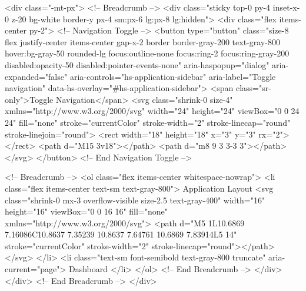 

















<div class="-mt-px">
    <!-- Breadcrumb -->
    <div class="sticky top-0 py-4 inset-x-0 z-20 bg-white border-y px-4 sm:px-6 lg:px-8 lg:hidden">
        <div class="flex items-center py-2">
            <!-- Navigation Toggle -->
            <button type="button"
                class="size-8 flex justify-center items-center gap-x-2 border border-gray-200 text-gray-800 hover:bg-gray-50 rounded-lg focus:outline-none focus:ring-2 focus:ring-gray-200 disabled:opacity-50 disabled:pointer-events-none"
                aria-haspopup="dialog" aria-expanded="false" aria-controls="hs-application-sidebar"
                aria-label="Toggle navigation" data-hs-overlay="#hs-application-sidebar">
                <span class="sr-only">Toggle Navigation</span>
                <svg class="shrink-0 size-4" xmlns="http://www.w3.org/2000/svg" width="24" height="24"
                    viewBox="0 0 24 24" fill="none" stroke="currentColor" stroke-width="2" stroke-linecap="round"
                    stroke-linejoin="round">
                    <rect width="18" height="18" x="3" y="3" rx="2"></rect>
                    <path d="M15 3v18"></path>
                    <path d="m8 9 3 3-3 3"></path>
                </svg>
            </button>
            <!-- End Navigation Toggle -->

            <!-- Breadcrumb -->
            <ol class="flex items-center whitespace-nowrap">
                <li class="flex items-center text-sm text-gray-800">
                    Application Layout
                    <svg class="shrink-0 mx-3 overflow-visible size-2.5 text-gray-400" width="16" height="16"
                        viewBox="0 0 16 16" fill="none" xmlns="http://www.w3.org/2000/svg">
                        <path d="M5 1L10.6869 7.16086C10.8637 7.35239 10.8637 7.64761 10.6869 7.83914L5 14"
                            stroke="currentColor" stroke-width="2" stroke-linecap="round"></path>
                    </svg>
                </li>
                <li class="text-sm font-semibold text-gray-800 truncate" aria-current="page">
                    Dashboard
                </li>
            </ol>
            <!-- End Breadcrumb -->
        </div>
    </div>
    <!-- End Breadcrumb -->
</div>

